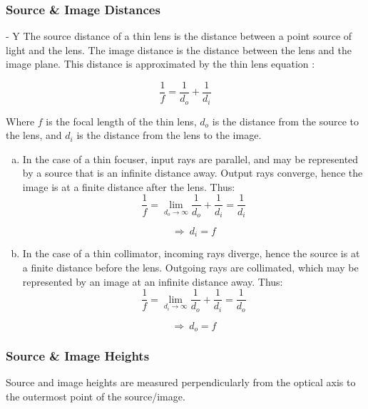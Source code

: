 \subsubsection{Source \& Image Distances} - Y \label{sec:thin-object-image-distances}
The source distance of a thin lens is the distance between a point source of light and the lens. The image distance is the distance between the lens and the image plane. This distance is approximated by the thin lens equation \cite{noauthor_undated-zn}:

\begin{equation} \label{eq:thin-lens}
    \frac{1}{f} = \frac{1}{d_o} + \frac{1}{d_i}
\end{equation}

Where $f$ is the focal length of the thin lens, $d_o$ is the distance from the source to the lens, and $d_i$ is the distance from the lens to the image.

\begin{enumerate}[(a)]
    \item In the case of a thin focuser, input rays are parallel, and may be represented by a source that is an infinite distance away. Output rays converge, hence the image is at a finite distance after the lens. Thus:
    \begin{equation}
        \frac{1}{f} = \lim_{d_o\to\infty} \frac{1}{d_o} + \frac{1}{d_i} = \frac{1}{d_i}
    \end{equation}
    
    \begin{equation} \label{eq:image-distance}
        \Rightarrow \ \boxed{d_i = f}    
    \end{equation}
    
    \item In the case of a thin collimator, incoming rays diverge, hence the source is at a finite distance before the lens. Outgoing rays are collimated, which may be represented by an image at an infinite distance away. Thus:
    \begin{equation}
        \frac{1}{f} = \lim_{d_i\to\infty} \frac{1}{d_o} + \frac{1}{d_i} = \frac{1}{d_o}
    \end{equation}
    
    \begin{equation} \label{eq:source-distance}
        \Rightarrow \ \boxed{d_o = f}
    \end{equation}
\end{enumerate}

\subsubsection{Source \& Image Heights} 
Source and image heights are measured perpendicularly from the optical axis to the outermost point of the source/image.

